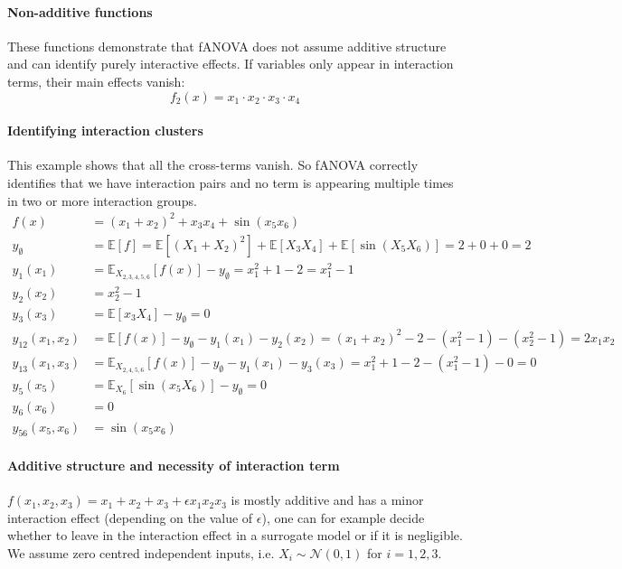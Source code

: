 \paragraph{Non-additive functions}
These functions demonstrate that fANOVA does not assume additive structure and can identify purely interactive effects. If variables only appear in interaction terms, their main effects vanish:
\[
f_2(x) = x_1 \cdot x_2 \cdot x_3 \cdot x_4
\]


\paragraph{Identifying interaction clusters}
This example shows that all the cross-terms vanish. So fANOVA correctly identifies that we have interaction pairs and no term is appearing multiple times in two or more interaction groups.
\begin{align*}
f(x) &= (x_1 + x_2)^2 + x_3 x_4 + \sin(x_5 x_6) \\[1em]
y_\emptyset &= \mathbb{E}[f] = \mathbb{E}[(X_1 + X_2)^2] + \mathbb{E}[X_3 X_4] + \mathbb{E}[\sin(X_5 X_6)] = 2 + 0 + 0 = 2 \\[1em]
y_1(x_1) &= \mathbb{E}_{X_{2,3,4,5,6}}[f(x)] - y_\emptyset = x_1^2 + 1 - 2 = x_1^2 - 1 \\
y_2(x_2) &= x_2^2 - 1 \\
y_3(x_3) &= \mathbb{E}[x_3 X_4] - y_\emptyset = 0 \\
y_{12}(x_1, x_2) &= \mathbb{E}[f(x)] - y_\emptyset - y_1(x_1) - y_2(x_2) = (x_1 + x_2)^2 - 2 - (x_1^2 - 1) - (x_2^2 - 1) = 2x_1 x_2 \\
y_{13}(x_1, x_3) &= \mathbb{E}_{X_{2,4,5,6}}[f(x)] - y_\emptyset - y_1(x_1) - y_3(x_3) = x_1^2 + 1 - 2 - (x_1^2 - 1) - 0 = 0 \\
y_5(x_5) &= \mathbb{E}_{X_6}[\sin(x_5 X_6)] - y_\emptyset = 0 \\
y_6(x_6) &= 0 \\
y_{56}(x_5, x_6) &= \sin(x_5 x_6)
\end{align*}


\paragraph{Additive structure and necessity of interaction term}
$f(x_1, x_2, x_3) = x_1 + x_2 + x_3 + \epsilon x_1 x_2 x_3$ is mostly additive and has a minor interaction effect (depending on the value of $\epsilon$), one can for example decide whether to leave in the interaction effect in a surrogate model or if it is negligible.
We assume zero centred independent inputs, i.e. $X_i \sim \mathcal{N}(0, 1)$ for $i = 1, 2, 3$.


